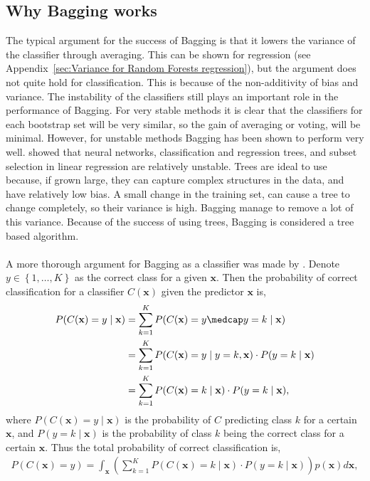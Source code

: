 \subsection{Why Bagging works}
\label{sub:Why Bagging works}
The typical argument for the success of Bagging is that it lowers the variance of the classifier through averaging. This can be shown for regression (see Appendix~\ref{sec:Variance for Random Forests regression}), but the argument does not quite hold for classification. This is because of the non-additivity of bias and variance. The instability of the classifiers still plays an important role in the performance of Bagging. For very stable methods it is clear that the classifiers for each bootstrap set will be very similar, so the gain of averaging or voting, will be minimal. However, for unstable methods Bagging has been shown to perform very well. \cite{Breiman1996Heur} showed that neural networks, classification and regression trees, and subset selection in linear regression are relatively unstable.
Trees are ideal to use because, if grown large, they can capture complex structures in the data, and have relatively low bias. A small change in the training set, can cause a tree to change completely, so their variance is high. Bagging manage to remove a lot of this variance. Because of the success of using trees, Bagging is considered a tree based algorithm.
\\
\\
A more thorough argument for Bagging as a classifier was made by \cite{Breiman1996}. Denote $y \in \left\{ 1, \ldots, K \right\}$ as the correct class for a given $\mathbf{x}$. Then the probability of correct classification for a classifier $C(\mathbf{x})$ given the predictor $\mathbf{x}$ is,
\begin{align}
  P(C(\mathbf{x}) = y \mid \mathbf{x})  &= \sum^{K}_{k=1} P(C(\mathbf{x})=y \medcap y = k \mid \mathbf{x}) \notag \\
  &= \sum^{K}_{k=1} P(C(\mathbf{x}) = y \mid y = k, \mathbf{x}) \cdot P(y=k \mid \mathbf{x}) \notag \\
  &= \sum^{K}_{k=1} P(C(\mathbf{x}) = k \mid \mathbf{x}) \cdot P(y=k \mid \mathbf{x}), 
\end{align}
where $P(C(\mathbf{x})=y \mid \mathbf{x})$ is the probability of $C$ predicting class $k$ for a certain $\mathbf{x}$, and $P(y=k \mid \mathbf{x})$ is the probability of class $k$ being the correct class for a certain $\mathbf{x}$. Thus the total probability of correct classification is,
\begin{align}
  P(C(\mathbf{x}) = y) = \int_{\mathbf{x}} \left(\sum^{K}_{k=1} P(C(\mathbf{x}) = k \mid \mathbf{x}) \cdot P(y=k \mid \mathbf{x})   \right) p(\mathbf{x}) d\mathbf{x},
\end{align}
